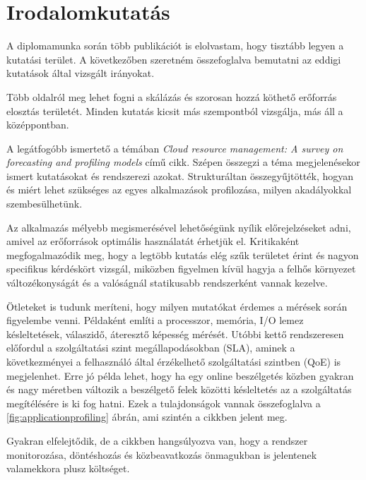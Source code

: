 \chapter{Irodalomkutatás}
\label{sec:Publications}
A diplomamunka során több publikációt is elolvastam, hogy tisztább legyen a kutatási terület. A következőben szeretném összefoglalva bemutatni az eddigi kutatások által vizsgált irányokat.

Több oldalról meg lehet fogni a skálázás és szorosan hozzá köthető erőforrás elosztás területét. Minden kutatás kicsit más szempontból vizsgálja, más áll a középpontban.

A legátfogóbb ismertető a témában \emph{Cloud resource management: A survey on forecasting and profiling models}\citep{CloudResourceManagement} című cikk. Szépen összegzi a téma megjelenésekor ismert kutatásokat és rendszerezi azokat. Strukturáltan összegyűjtötték, hogyan és miért lehet szükséges az egyes alkalmazások profilozása, milyen akadályokkal szembesülhetünk.

Az alkalmazás mélyebb megismerésével lehetőségünk nyílik előrejelzéseket adni, amivel az erőforrások optimális használatát érhetjük el.
Kritikaként megfogalmazódik meg, hogy a legtöbb kutatás elég szűk területet érint és nagyon specifikus kérdéskört vizsgál, miközben figyelmen kívül hagyja a felhős környezet változékonyságát és a valóságnál statikusabb rendszerként vannak kezelve. 

Ötleteket is tudunk meríteni, hogy milyen mutatókat érdemes a mérések során figyelembe venni.
Példaként említi  a processzor, memória, I/O lemez késleltetések, válaszidő, áteresztő képesség mérését.
Utóbbi kettő rendszeresen előfordul a szolgáltatási szint megállapodásokban (SLA), aminek a következményei a felhasználó által érzékelhető szolgáltatási szintben (QoE) is megjelenhet.
Erre jó példa lehet, hogy ha egy online beszélgetés közben gyakran és nagy méretben változik a beszélgető felek közötti késleltetés az a szolgáltatás megítélésére is ki fog hatni.
Ezek a tulajdonságok vannak összefoglalva a \ref{fig:applicationprofiling} ábrán, ami szintén a cikkben jelent meg.

Gyakran elfelejtődik, de a cikkben hangsúlyozva van, hogy a rendszer monitorozása, döntéshozás és közbeavatkozás önmagukban is jelentenek valamekkora plusz költséget. \\



